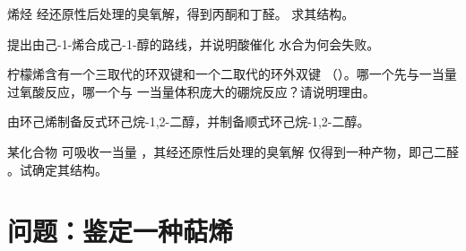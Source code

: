 \begin{exercise}[$\star\star$]\label{exo:b2:alkene-redox:8}
烯烃  经还原性后处理的臭氧解，得到丙酮和丁醛。
求其结构。
\end{exercise}

\begin{exercise}[$\star\star$]\label{exo:b2:alkene-redox:9}
提出由己-1-烯合成己-1-醇的路线，并说明酸催化
水合为何会失败。
\end{exercise}

\begin{exercise}[$\star\star\star$]\label{exo:b2:alkene-redox:10}
柠檬烯含有一个三取代的环双键和一个二取代的环外双键
（）。哪一个先与一当量过氧酸反应，哪一个与
一当量体积庞大的硼烷反应？请说明理由。
\end{exercise}

\begin{exercise}[$\star\star\star$]\label{exo:b2:alkene-redox:11}
由环己烯制备反式环己烷-1,2-二醇，并制备顺式环己烷-1,2-二醇。
\end{exercise}

\begin{exercise}[$\star\star\star$]\label{exo:b2:alkene-redox:12}
某化合物  可吸收一当量 ，其经还原性后处理的臭氧解
仅得到一种产物，即己二醛 。试确定其结构。
\end{exercise}

\section{问题：鉴定一种萜烯}

